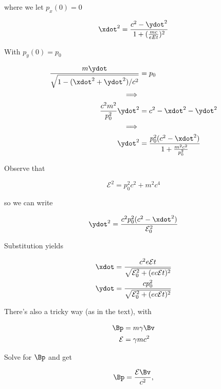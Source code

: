 where we let $p_x(0) = 0$

\begin{equation}\label{eqn:relativisticElectrodynamicsT3:n}
\xdot^2 = \frac{c^2 - \ydot^2}{1 + (\frac{mc}{eEt})^2}
\end{equation}

With $p_y(0) = p_0$

\begin{align*}
\frac{m \ydot}{\sqrt{1 - (\xdot^2 + \ydot^2)/c^2}} &= p_0 \\
\implies \\
\frac{c^2 m^2}{p_0^2} \ydot^2 &= c^2 - \xdot^2 - \ydot^2 \\
\implies \\
\ydot^2 &= \frac{ p_0^2 (c^2 - \xdot^2)}{1 + \frac{m^2 c^2}{p_0^2}}
\end{align*}

Observe that 

\begin{equation}\label{eqn:relativisticElectrodynamicsT3:n}
\mathcal{E}^2 = p_0^2 c^2 + m^2 c^4
\end{equation}

so we can write

\begin{equation}\label{eqn:relativisticElectrodynamicsT3:n}
\ydot^2 = \frac{ c^2 p_0^2 (c^2 - \xdot^2)}{ \mathcal{E}_0^2 }
\end{equation}

Substitution yields

\begin{align}\label{eqn:relativisticElectrodynamicsT3:n}
\xdot &= \frac{c^2 e \mathcal{E} t}{\sqrt{ \mathcal{E}_0^2 + (e c \mathcal{E} t)^2 }} \\
\ydot &= \frac{c p_0^2 }{\sqrt{ \mathcal{E}_0^2 + (e c \mathcal{E} t)^2 }}
\end{align}

There's also a tricky way (as in the text), with 

\begin{align}\label{eqn:relativisticElectrodynamicsT3:n}
\Bp &= m \gamma \Bv  \\
\mathcal{E} &= \gamma m c^2 
\end{align}

Solve for $\Bp$ and get

\begin{equation}\label{eqn:relativisticElectrodynamicsT3:n}
\Bp = \frac{\mathcal{E} \Bv}{c^2},
\end{equation}

